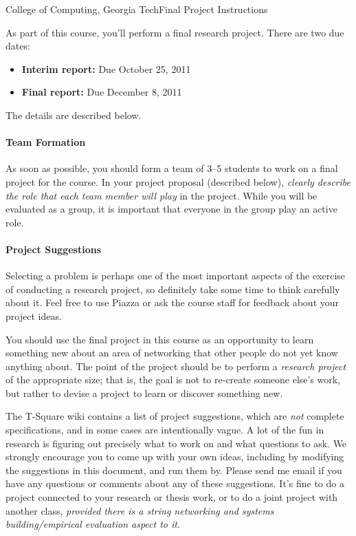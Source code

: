 \documentclass[11pt]{article}
\begin{document}


{College of Computing, Georgia Tech}{Final Project Instructions}

As part of this course, you'll perform a final research project.  There
are two due dates:
\begin{itemize}
\itemsep=-1pt
\item {\bf Interim report:} Due October 25, 2011
\item {\bf Final report:} Due December 8, 2011
\end{itemize}
\noindent 
The details are described below.

\paragraph{Team Formation} As soon as possible, you should form a team
of 3--5 students to work on a final project for the course.  In your
project proposal (described below), {\em clearly describe the role that
  each team member will play} in the project.  While you will be
evaluated as a group, it is important that everyone in the group play an
active role.

\paragraph{Project Suggestions}
Selecting a problem is perhaps one of the most important aspects of the
exercise of conducting a research project, so definitely take some time
to think carefully about it.  Feel free to use Piazza or ask the course
staff for feedback about your project ideas.

You should use the final project in this course as an opportunity to
learn something new about an area of networking that other people do not
yet know anything about.  The point of the project should be to perform
a {\em research project} of the appropriate size; that is, the goal is
not to re-create someone else's work, but rather to devise a project to
learn or discover something new.

The T-Square wiki contains a list of project suggestions, which are {\em
  not} complete specifications, and in some cases are intentionally
vague.  A lot of the fun in research is figuring out precisely what to
work on and what questions to ask.  We strongly encourage you to come up
with your own ideas, including by modifying the suggestions in this
document, and run them by. Please send me email if you have any
questions or comments about any of these suggestions. It's fine to do a
project connected to your research or thesis work, or to do a joint
project with another class, {\em provided there is a string networking
  and systems building/empirical evaluation aspect to it}.  
\end{document}
